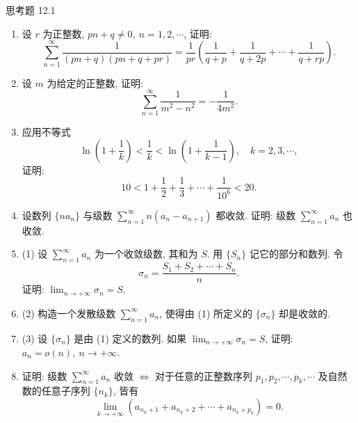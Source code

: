 \begin{exblock}{思考题 12.1}
\begin{enumerate}
  \item 设 $r$ 为正整数, $pn+q\neq0,\ n=1,2,\cdots$, 证明:
  \[
    \sum_{n=1}^{\infty}\frac{1}{(pn+q)(pn+q+pr)}=\frac{1}{pr}\left(\frac{1}{q+p}+\frac{1}{q+2p}+\cdots+\frac{1}{q+rp}\right).
\]
  \item 设 $m$ 为给定的正整数, 证明:
  \[
    \sum_{n=1}^{\infty}\frac{1}{m^{2}-n^{2}}=-\frac{1}{4m^{2}}.
\]
  \item 应用不等式
  \[
    \ln\left(1+\frac{1}{k}\right)<\frac{1}{k}<\ln\left(1+\frac{1}{k-1}\right),\quad k=2,3,\cdots,
\]
  证明:
  \[
    10<1+\frac{1}{2}+\frac{1}{3}+\cdots+\frac{1}{10^{6}}<20.
\]
  \item 设数列 $\{na_{n}\}$ 与级数 $\sum_{n=1}^{\infty}n(a_{n}-a_{n+1})$ 都收敛. 证明: 级数 $\sum_{n=1}^{\infty}a_{n}$ 也收敛.
  \item (1) 设 $\sum_{n=1}^{\infty}a_{n}$ 为一个收敛级数, 其和为 $S$. 用 $\{S_{n}\}$ 记它的部分和数列. 令
  \[
    \sigma_{n}=\frac{S_{1}+S_{2}+\cdots+S_{n}}{n}.
\]
  证明: $\lim_{n\to+\infty}\sigma_{n}=S$.
  \item (2) 构造一个发散级数 $\sum_{n=1}^{\infty}a_{n}$, 使得由 (1) 所定义的 $\{\sigma_{n}\}$ 却是收敛的.
  \item (3) 设 $\{\sigma_{n}\}$ 是由 (1) 定义的数列. 如果 $\lim_{n\to+\infty}\sigma_{n}=S$, 证明: $a_{n}=o(n),\ n\to+\infty$.
  \item 证明: 级数 $\sum_{n=1}^{\infty}a_{n}$ 收敛 $\Leftrightarrow$ 对于任意的正整数序列 $p_{1},p_{2},\cdots,p_{k},\cdots$ 及自然数的任意子序列 $\{n_{k}\}$, 皆有
  \[
    \lim_{k\to+\infty}\left(a_{n_{k}+1}+a_{n_{k}+2}+\cdots+a_{n_{k}+p_{k}}\right)=0.
\]
\end{enumerate}
\end{exblock}
